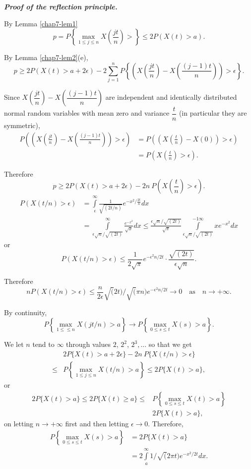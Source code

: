 \noindent
\textbf{\textit{Proof of the reflection principle.}}
\smallskip

By Lemma \ref{chap7-lem1}
$$
p=P\left\{\max\limits_{1\leq j\leq
  n}X\left(\frac{jt}{n}\right)>\right\}\leq 2P(X(t)>a).
$$

By Lemma \ref{chap7-lem2}(e),
$$
p\geq 2P(X(t)>a+2\epsilon)-2\sum\limits^{n}_{j=1}P\left\{\left(X\left(\frac{jt}{n}\right)-X\left(\frac{(j-1)t}{n}\right)\right)>\epsilon\right\}.
$$

Since $X\left(\dfrac{jt}{n}\right)-X\left(\dfrac{(j-1)t}{n}\right)$
are independent and 
identically distribu\-ted normal random variables with mean zero and
variance $\dfrac{t}{n}$ (in particular they are symmetric),
\begin{align*}
P\left(\left(X\left(\frac{jt}{n}\right)-X\left(\frac{(j-1)t}{n}\right)\right)>\epsilon\right)
&=
P\left(\left(X\left(\frac{t}{n}\right)-X(0)\right)>\epsilon\right)\\
&= P\left(X\left(\frac{t}{n}\right)>\epsilon\right).
\end{align*}

Therefore
$$
p\geq
2P(X(t)>a+2\epsilon)-2n\ P\left(X\left(\frac{t}{n}\right)>\epsilon\right). 
$$
\begin{align*}
P(X(t/n)>\epsilon) &=
\int\limits^{\infty}_{\epsilon}\frac{1}{\sqrt{(2t/n)}}e^{-x^{2}/\frac{2t}{n}}dx\\
&=
\int\limits^{\infty}_{\epsilon\sqrt{n}/\sqrt{(2t)}}\frac{e^{-x^{2}}}{\sqrt{x}}dx\leq \frac{\epsilon\sqrt{n}/\sqrt{(2t)}}{\sqrt{\pi}}\int\limits^{-1\infty}_{\epsilon\sqrt{n}/\sqrt{(2t)}}xe^{-x^{2}}dx
\end{align*}
or 
$$
P(X(t/n)>\epsilon)\leq \frac{1}{2\sqrt{\pi}}e^{-\epsilon^{2}n/2t}\cdot
\frac{\sqrt{(2t)}}{\epsilon\sqrt{n}}.
$$

Therefore
$$
nP(X(t/n)>\epsilon)\leq \dfrac{n}{2\epsilon}\surd(2t)/\surd(\pi
n)e^{-\epsilon^{2}n/2t}\to 0\quad\text{as}\quad n\to +\infty.
$$\pageoriginale

By continuity,
$$
P\left\{\max\limits_{1\leq \leq n}X(jt/n)>a\right\}\to
P\left\{\max\limits_{0\leq s\leq t}X(s)>a\right\}.
$$

We let $n$ tend to $\infty$ through values $2$, $2^{2}$,
$2^{3},\ldots$ so that we get
\begin{align*}
& 2P\{X(t)>a+2\epsilon\}-2n\ P\{X(t/n)>\epsilon\}\\
\leq  & P\left\{\max\limits_{1\leq j\leq n}X(t/n)>a\right\}\leq 2P\{X(t)>a\},
\end{align*}
or
\begin{align*}
2P\{X(t)>a\}\leq 2P\{X(t)\geq a\} \leq & P\left\{\max\limits_{0\leq
  s\leq t}X(t)>a\right\}\\[4pt]
& 2P\{X(t)>a\},
\end{align*}
on letting $n\to +\infty$ first and then letting $\epsilon\to
0$. Therefore,
\begin{align*}
P\left\{\max\limits_{0\leq s\leq t}X(s)>a\right\} &= 2P\{X(t)>a\}\\
&= 2\int\limits^{\infty}_{a}1/\surd(2\pi t)e^{-x^{2}/2t}dx.
\end{align*}

